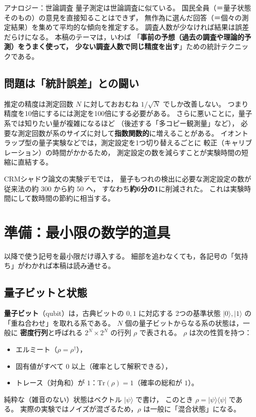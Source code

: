 \documentclass[11pt]{ltjsarticle}
\newcommand{\Tr}{\mathrm{Tr}}
\newcommand{\ket}[1]{|#1\rangle}
\newcommand{\ketbra}[2]{|#1\rangle\langle#2|}
\begin{document}
\begin{analogybox}{アナロジー：世論調査}
量子測定は世論調査に似ている。
国民全員（＝量子状態そのもの）の意見を直接知ることはできず，
無作為に選んだ回答（＝個々の測定結果）を集めて平均的な傾向を推定する。
調査人数が少なければ結果は誤差だらけになる。
本稿のテーマは，いわば
「\textbf{事前の予想（過去の調査や理論的予測）をうまく使って，
少ない調査人数で同じ精度を出す}」ための統計テクニックである。
\end{analogybox}

\subsection{問題は「統計誤差」との闘い}

推定の精度は測定回数 $N$ に対しておおむね $1/\sqrt{N}$ でしか改善しない。
つまり精度を10倍にするには測定を100倍にする必要がある。
さらに悪いことに，量子系では知りたい量が複雑になるほど
（後述する「多コピー観測量」など），
必要な測定回数が系のサイズに対して\textbf{指数関数的}に増えることがある。
イオントラップ型の量子実験などでは，測定設定を1つ切り替えるごとに
較正（キャリブレーション）の時間がかかるため，
測定設定の数を減らすことが実験時間の短縮に直結する。

CRMシャドウ論文の実験デモでは，
量子もつれの検出に必要な測定設定の数が
従来法の約 $300$ から約 $50$ へ，
すなわち\textbf{約6分の1}に削減された。
これは実験時間にして数時間の節約に相当する。

\section{準備：最小限の数学的道具}

以降で使う記号を最小限だけ導入する。
細部を追わなくても，各記号の「気持ち」がわかれば本稿は読み通せる。

\subsection{量子ビットと状態}

\textbf{量子ビット}（qubit）は，古典ビットの $0,1$ に対応する
2つの基準状態 $\ket{0},\ket{1}$ の「重ね合わせ」を取れる系である。
$N$ 個の量子ビットからなる系の状態は，一般に
\textbf{密度行列}と呼ばれる $2^N \times 2^N$ の行列 $\rho$ で表される。
$\rho$ は次の性質を持つ：
\begin{itemize}
  \item エルミート（$\rho = \rho^\dagger$），
  \item 固有値がすべて $0$ 以上（確率として解釈できる），
  \item トレース（対角和）が $1$：$\Tr(\rho)=1$（確率の総和が $1$）。
\end{itemize}
純粋な（雑音のない）状態はベクトル $\ket{\psi}$ で書け，
このとき $\rho = \ketbra{\psi}{\psi}$ である。
実際の実験ではノイズが混ざるため，$\rho$ は一般に「混合状態」になる。
\end{document}
